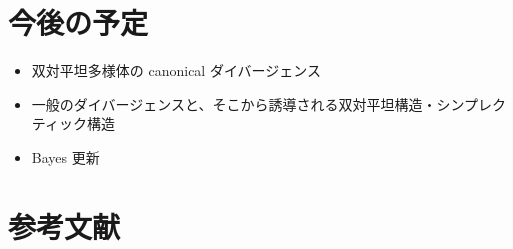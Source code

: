 \documentclass[report]{jlreq}
\begin{document}
%
%
%


%
\section*{今後の予定}

\begin{itemize}
    \item 双対平坦多様体の canonical ダイバージェンス
    \item 一般のダイバージェンスと、そこから誘導される双対平坦構造・シンプレクティック構造
    \item Bayes 更新
\end{itemize}

%
\section*{参考文献}


\nocite{amari_information_2016}

{
    \renewcommand{\bibsection}{}
    
    
}

%
\end{document}
